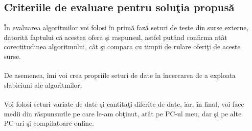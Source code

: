 \documentclass[runningheads]{llncs}
\begin{document}
\subsection{Criteriile de evaluare pentru solu\c{t}ia propus\u{a}}
\hspace{6pt}\^{I}n evaluarea algoritmilor voi folosi \^{i}n prim\u{a} faz\u{a} seturi de teste din surse externe, datorit\u{a} faptului c\u{a} acestea ofera \c{s}i raspunsul, astfel put\^{a}nd confirma at\^{a}t corectitudinea algoritmului, c\^{a}t \c{s}i compara cu timpii de rulare oferi\c{t}i de aceste surse.
\paragraph{}De asemenea, \^{i}mi voi crea propriile seturi de date \^{i}n \^{i}ncercarea de a exploata slabiciuni ale algoritmilor.
\paragraph{}Voi folosi seturi variate de date \c{s}i cantita\c{t}i diferite de date, iar, \^{i}n final, voi face medii din r\u{a}spunsurile pe care le-am ob\c{t}inut, at\^{a}t pe PC-ul meu, dar \c{s}i pe alte PC-uri \c{s}i compilatoare online.
\end{document}
